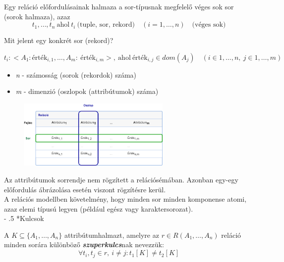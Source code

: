 \documentclass[tikz,12pt,margin=0px]{article}
\makeatletter
\renewcommand\paragraph{%
	\@startsection{paragraph}{4}{0mm}%
	{-\baselineskip}%
	{.5\baselineskip}%
	{\normalfont\normalsize\bfseries}}
\makeatother
\begin{document}
    \noindent Egy reláció előfordulásainak halmaza a sor-típusnak megfelelő véges sok sor (sorok halmaza), azaz
    \[
        {t_1, \ldots , t_n}\ \text{ahol}\ t_i\ \text{(tuple, sor, rekord)}\quad (i = 1, \ldots, n)\quad \text{(véges sok)}
    \]

    \noindent  Mit jelent egy konkrét sor (rekord)?
    \begin{center}
        $t_{i}: <A_1: \text{érték}_{i,1}, \ldots, A_m:\ \text{érték}_{i,m}>,\ \text{ahol}\ \text{érték}_{i, j} \in dom(A_{j}) \quad (i \in 1, \ldots, n,\ j \in 1, \ldots, m)$
    \end{center}
    \begin{itemize}
        \item \emph{n} - számosság (sorok (rekordok) száma)
        \item \emph{m} - dimenzió (oszlopok (attribútumok) száma)
    \end{itemize}

 	\begin{figure}[H]
 		\centering
 		\includegraphics[width=0.66\textwidth]{img/table_relation.png}
 	\end{figure}

    \noindent Az attribútumok sorrendje nem rögzített a relációsémában. Azonban egy-egy előfordulás ábrázolása esetén viszont rögzítésre kerül.\\

    \noindent A relációs modellben követelmény, hogy minden sor minden komponense atomi, azaz elemi típusú legyen (például egész vagy karaktersorozat).\\

    \noindent \paragraph*{Kulcsok\\}

    \noindent A $K \subseteq \{A_1, \ldots, A_n\}$ attribútumhalmazt, amelyre az $r \in R(A_1, \ldots, A_n)$ reláció minden sorára különböző \emph{\textbf{szuperkulcs}}nak nevezzük:
    \[
        \forall t_i, t_j \in r,\ i \neq j : t_1[K] \neq t_2[K]
    \]
\end{document}

